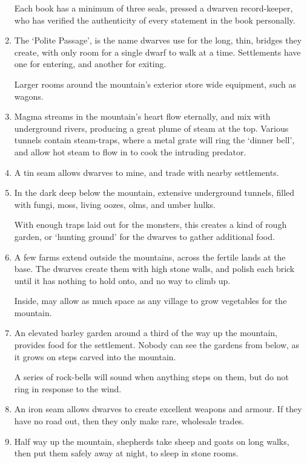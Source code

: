 \begin{multicols}{2}
\begin{enumerate}
  Each book has a minimum of three seals, pressed a dwarven record-keeper, who has verified the authenticity of every statement in the book personally.
  \item
  The `Polite Passage', is the name dwarves use for the long, thin, bridges they create, with only room for a single dwarf to walk at a time.
  Settlements have one for entering, and another for exiting.

  Larger rooms around the mountain's exterior store wide equipment, such as wagons.
  \item
  Magma streams in the mountain's heart flow eternally, and mix with underground rivers, producing a great plume of steam at the top.
  Various tunnels contain steam-traps, where a metal grate will ring the `dinner bell', and allow hot steam to flow in to cook the intruding predator.
  \item
  A tin seam allows dwarves to mine, and trade with nearby settlements.
  \item
  In the dark \gls{deep} below the mountain, extensive underground tunnels, filled with fungi, moss, living oozes, olms, and umber hulks.

  With enough traps laid out for the monsters, this creates a kind of rough garden, or `hunting ground' for the dwarves to gather additional food.
  \item
  A few farms extend outside the mountains, across the fertile lands at the base.
  The dwarves create them with high stone walls, and polish each brick until it has nothing to hold onto, and no way to climb up.

  Inside, may allow as much space as any \gls{village} to grow vegetables for the mountain.
  \item
  An elevated barley garden around a third of the way up the mountain, provides food for the settlement.
  Nobody can see the gardens from below, as it grows on steps carved into the mountain.

  A series of rock-bells will sound when anything steps on them, but do not ring in response to the wind.
  \item
  An iron seam allows dwarves to create excellent weapons and armour.
  If they have no road out, then they only make rare, wholesale trades.
  \item
  Half way up the mountain, shepherds take sheep and goats on long walks, then put them safely away at night, to sleep in stone rooms.
\end{enumerate}


\end{multicols}
